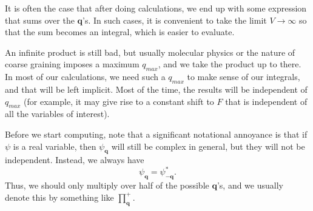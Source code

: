 \documentclass[a4paper]{article}
\begin{document}
It is often the case that after doing calculations, we end up with some expression that sums over the $\mathbf{q}$'s. In such cases, it is convenient to take the limit $V \to \infty$ so that the sum becomes an integral, which is easier to evaluate.

An infinite product is still bad, but usually molecular physics or the nature of coarse graining imposes a maximum $q_{max}$, and we take the product up to there. In most of our calculations, we need such a $q_{max}$ to make sense of our integrals, and that will be left implicit. Most of the time, the results will be independent of $q_{max}$ (for example, it may give rise to a constant shift to $F$ that is independent of all the variables of interest).

Before we start computing, note that a significant notational annoyance is that if $\psi$ is a real variable, then $\psi_\mathbf{q}$ will still be complex in general, but they will not be independent. Instead, we always have
\[
  \psi_\mathbf{q} = \psi_{-\mathbf{q}}^*.
\]
Thus, we should only multiply over half of the possible $\mathbf{q}$'s, and we usually denote this by something like $\prod^+_{\mathbf{q}}$.
\end{document}
